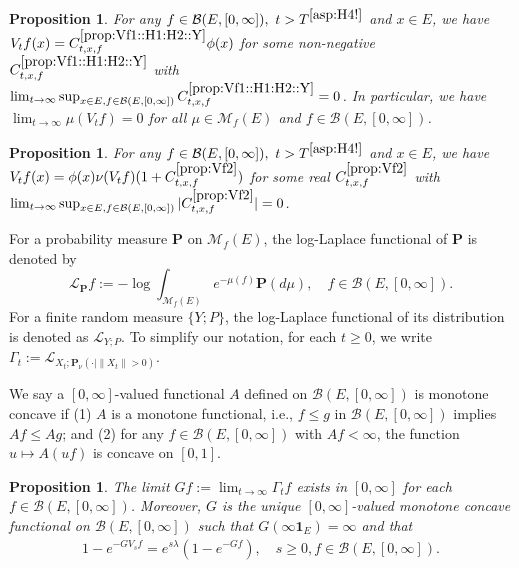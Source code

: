 \documentclass[12pt,a4paper]{amsart}
\numberwithin{equation}{section}
\theoremstyle{plain}
\newtheorem{prop}[thm]{Proposition}
\theoremstyle{definition}
\theoremstyle{remark}
\begin{document}
\begin{prop} \label{prop:Vf1::H1:H2::Y}
	For any $f\in \mathcal B(E, [0,\infty]),~t > T^{\eqref{asp:H4!}}$ and $x\in E$, we have $V_tf(x) = C^{\ref{prop:Vf1::H1:H2::Y}}_{t,x,f} \phi(x)$ for some non-negative $C_{t,x,f}^{\ref{prop:Vf1::H1:H2::Y}}$ with $\lim_{t\to \infty} \sup_{x\in E, f\in \mathcal B(E, [0,\infty])}  C^{\ref{prop:Vf1::H1:H2::Y}}_{t,x,f} = 0$.
	In particular, we have $\lim_{t\to \infty} \mu(V_tf)= 0 $ for all $\mu \in \mathcal M_f(E)$ and $f\in \mathcal B(E,[0,\infty])$.
\end{prop}

\begin{prop} \label{prop:Vf2}
	For any $f\in \mathcal B(E,[0,\infty]),~t>T^{\eqref{asp:H4!}}$ and $x\in E$, we have $V_tf(x) = \phi(x) \nu (V_tf) (1+C^{\ref{prop:Vf2}}_{t,x,f}) $ for some real $C^{\ref{prop:Vf2}}_{t,x,f}$ with 
$\lim_{t\to \infty} \sup_{x\in E, f\in \mathcal B(E, [0,\infty])} |C^{\ref{prop:Vf2}}_{t,x,f}| = 0$.
\end{prop}

	For a probability measure $\mathbf P$ on $\mathcal M_f(E)$, 
	the log-Laplace functional of $\mathbf P$ is denoted by
	\[
	\mathscr L_\mathbf P f := - \log \int_{\mathcal M_f(E)}  e^{-\mu(f)} \mathbf P(d\mu), \quad 
	f\in \mathcal B(E,[0,\infty]).
	\]
	For a finite random measure $\{Y; P\}$, the log-Laplace functional of its distribution is denoted as $\mathscr L_{Y;P}$. 
	To simplify our notation, for each $t\geq 0$, we write $\Gamma_t := \mathscr L_{X_t;\mathbf P_\nu(\cdot | \|X_t\|>0)}$. 

	We say a $[0,\infty]$-valued functional $A$ defined on $\mathcal B(E,[0,\infty])$ is monotone concave if
	(1) $A$ is a monotone functional, i.e., $f\leq g$ in $\mathcal B(E,[0,\infty])$ implies $Af \leq Ag$; and
	(2) for any $f\in \mathcal B(E,[0,\infty])$ with $Af< \infty$, the function $u \mapsto A(uf)$ is concave on $[0,1]$.

\begin{prop} \label{prop:G}
	The limit $Gf:= \lim_{t\to \infty} \Gamma_t f$ exists in $[0,\infty]$ for each $f\in \mathcal B(E,[0,\infty])$.
	Moreover, $G$ is the unique $[0,\infty]$-valued monotone concave functional on $\mathcal B(E,[0,\infty])$ such that $G(\infty  \mathbf 1_E) = \infty$ and that
\begin{align} \label{eq:G.0}
	1 - e^{- GV_s f}
	= e^{s\lambda} (1 - e^{-Gf}),
	\quad s\geq 0, f\in \mathcal B(E,[0,\infty]).
\end{align}
\end{prop}
\end{document}
